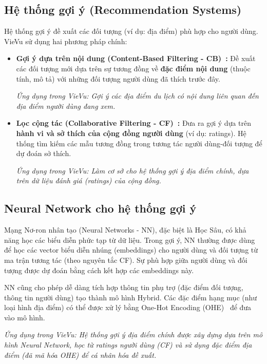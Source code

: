 \subsection{Hệ thống gợi ý (Recommendation Systems)}

Hệ thống gợi ý đề xuất các đối tượng (ví dụ: địa điểm) phù hợp cho người dùng. VieVu sử dụng hai phương pháp chính:
\begin{itemize}
    \item \textbf{Gợi ý dựa trên nội dung (Content-Based Filtering - CB)~\cite{cb_concept}:} Đề xuất các đối tượng mới dựa trên sự tương đồng về \textbf{đặc điểm nội dung} (thuộc tính, mô tả) với những đối tượng người dùng đã thích trước đây.

    \textit{Ứng dụng trong VieVu: Gợi ý các địa điểm du lịch có nội dung liên quan đến địa điểm người dùng đang xem.}

    \item \textbf{Lọc cộng tác (Collaborative Filtering - CF)~\cite{cf_concept}:} Đưa ra gợi ý dựa trên \textbf{hành vi và sở thích của cộng đồng người dùng} (ví dụ: ratings). Hệ thống tìm kiếm các mẫu tương đồng trong tương tác người dùng-đối tượng để dự đoán sở thích.

    \textit{Ứng dụng trong VieVu: Làm cơ sở cho hệ thống gợi ý địa điểm chính, dựa trên dữ liệu đánh giá (ratings) của cộng đồng.}
\end{itemize}
\subsection{Neural Network cho hệ thống gợi ý}

Mạng Nơ-ron nhân tạo (Neural Networks - NN), đặc biệt là Học Sâu, có khả năng học các biểu diễn phức tạp từ dữ liệu. Trong gợi ý, NN thường được dùng để học các vector biểu diễn nhúng (embeddings) cho người dùng và đối tượng từ ma trận tương tác (theo nguyên tắc CF). Sự phù hợp giữa người dùng và đối tượng được dự đoán bằng cách kết hợp các embeddings này.

NN cũng cho phép dễ dàng tích hợp thông tin phụ trợ (đặc điểm đối tượng, thông tin người dùng) tạo thành mô hình Hybrid. Các đặc điểm hạng mục (như loại hình địa điểm) có thể được xử lý bằng One-Hot Encoding (OHE)~\cite{ohe_concept} để đưa vào mô hình.

\textit{Ứng dụng trong VieVu: Hệ thống gợi ý địa điểm chính được xây dựng dựa trên mô hình Neural Network, học từ ratings người dùng (CF) và sử dụng đặc điểm địa điểm (đã mã hóa OHE) để cá nhân hóa đề xuất.}

